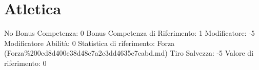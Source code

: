 \section{Atletica}\label{atletica}

\begin{description}
\tightlist
\item[Tags: ABI]
No Bonus Competenza: 0 Bonus Competenza di Riferimento: 1 Modificatore:
-5 Modificatore Abilità: 0 Statistica di riferimento: Forza
(Forza\%200cd8d400e38d48c7a2c3dd4635c7cabd.md) Tiro Salvezza: -5 Valore
di riferimento: 0
\end{description}
